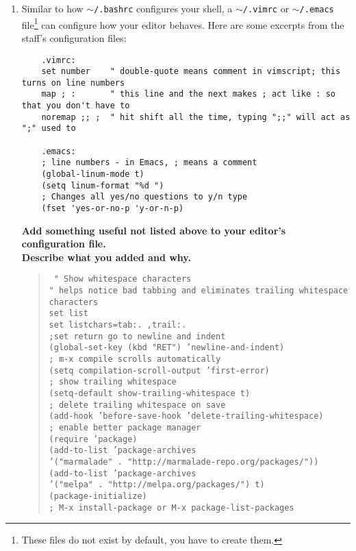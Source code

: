 \documentclass{article}
\begin{document}
\begin{enumerate}
  \item Similar to how \texttt{$\sim$/.bashrc} configures your shell, a
    \texttt{$\sim$/.vimrc} or \texttt{$\sim$/.emacs} file\footnote{
      These files do not exist by default, you have to create them.
    } can configure how your editor behaves. Here are some excerpts from the
    staff's configuration files:
    \begin{lstlisting}
    .vimrc:
    set number    " double-quote means comment in vimscript; this turns on line numbers
    map ; :       " this line and the next makes ; act like : so that you don't have to
    noremap ;; ;  " hit shift all the time, typing ";;" will act as ";" used to

    .emacs:
    ; line numbers - in Emacs, ; means a comment
    (global-linum-mode t)
    (setq linum-format "%d ")
    ; Changes all yes/no questions to y/n type
    (fset 'yes-or-no-p 'y-or-n-p)
    \end{lstlisting}
    \textbf{Add something useful not listed above to your editor's configuration file.\\
      Describe  what you added and why.}
      \begin{quote}\tt\small
        \color{blue}
        " Show whitespace characters\\
        " helps notice bad tabbing and eliminates trailing whitespace characters\\
        set list\\
        set listchars=tab:.\ ,trail:.\\

        \color{red}
        ;set return go to newline and indent\\
        (global-set-key (kbd "RET") 'newline-and-indent)\\

        ; m-x compile scrolls automatically\\
        (setq compilation-scroll-output 'first-error)\\

        ; show trailing whitespace\\
        (setq-default show-trailing-whitespace t)\\
        ; delete trailing whitespace on save\\
        (add-hook 'before-save-hook 'delete-trailing-whitespace)\\

        ; enable better package manager\\
        (require 'package)\\
        (add-to-list 'package-archives\\
                     '("marmalade" . "http://marmalade-repo.org/packages/"))\\
        (add-to-list 'package-archives\\
                     '("melpa" . "http://melpa.org/packages/") t)\\
        (package-initialize)\\
        ; M-x install-package or M-x package-list-packages\\


\end{quote}
\end{enumerate}
\end{document}

